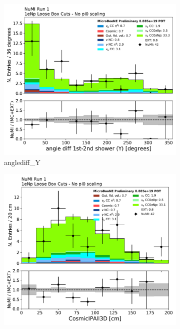 \begin{figure}[H]
    \centering
    \begin{subfigure}{0.3\textwidth}
    \includegraphics[width=1.0\textwidth]{Sidebands/Figures/NuMI/1eNp/anglediff_Y.pdf}
    \caption{anglediff\_Y}
    \end{subfigure}
    \begin{subfigure}{0.3\textwidth}
    \includegraphics[width=1.0\textwidth]{Sidebands/Figures/NuMI/1eNp/CosmicIPAll3D.pdf}

\end{subfigure}
\end{figure}
